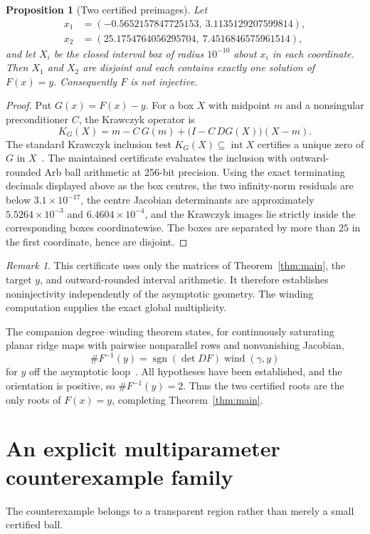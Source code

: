 \documentclass[11pt]{article}
\newtheorem{proposition}[theorem]{Proposition}
\theoremstyle{remark}
\newtheorem{remark}[theorem]{Remark}
\newcommand{\wind}{\operatorname{wind}}
\begin{document}
\begin{proposition}[Two certified preimages]\label{prop:krawczyk}
Let
\[
\begin{aligned}
   x_1&=(-0.5652157847725153,\ 3.1135129207599814),\\
   x_2&=(25.1754764056295704,\ 7.4516846575961514),
 \end{aligned}
\]
and let $X_i$ be the closed interval box of radius $10^{-10}$ about $x_i$ in each coordinate. Then $X_1$ and $X_2$ are disjoint and each contains exactly one solution of $F(x)=y$. Consequently $F$ is not injective.
\end{proposition}

\begin{proof}
Put $G(x)=F(x)-y$. For a box $X$ with midpoint $m$ and a nonsingular preconditioner $C$, the Krawczyk operator is
\[
 K_G(X)=m-C\,G(m)+\bigl(I-C\,DG(X)\bigr)(X-m).
\]
The standard Krawczyk inclusion test $K_G(X)\subseteq\operatorname{int}X$ certifies a unique zero of $G$ in $X$~\cite[Ch.~8]{MooreInterval}. The maintained certificate evaluates the inclusion with outward-rounded Arb ball arithmetic at 256-bit precision. Using the exact terminating decimals displayed above as the box centres, the two infinity-norm residuals are below $3.1\times10^{-17}$, the centre Jacobian determinants are approximately $5.5264\times10^{-3}$ and $6.4604\times10^{-4}$, and the Krawczyk images lie strictly inside the corresponding boxes coordinatewise. The boxes are separated by more than $25$ in the first coordinate, hence are disjoint.
\end{proof}

\begin{remark}
This certificate uses only the matrices of Theorem~\ref{thm:main}, the target $y$, and outward-rounded interval arithmetic. It therefore establishes noninjectivity independently of the asymptotic geometry. The winding computation supplies the exact global multiplicity.
\end{remark}

The companion degree--winding theorem states, for continuously saturating planar ridge maps with pairwise nonparallel rows and nonvanishing Jacobian,
\[
 \#F^{-1}(y)=\operatorname{sgn}(\det DF)\wind(\gamma,y)
\]
for $y$ off the asymptotic loop~\cite{DixonPolygon}. All hypotheses have been established, and the orientation is positive, so $\#F^{-1}(y)=2$. Thus the two certified roots are the only roots of $F(x)=y$, completing Theorem~\ref{thm:main}.

\section{An explicit multiparameter counterexample family}\label{sec:family}
The counterexample belongs to a transparent region rather than merely a small certified ball.
\end{document}
